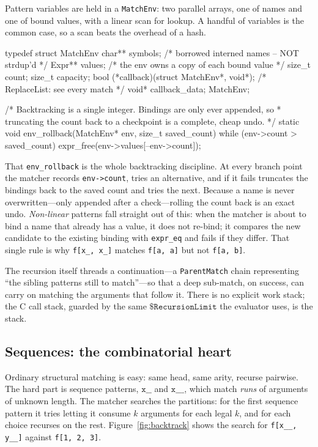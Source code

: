 Pattern variables are held in a \texttt{MatchEnv}: two parallel arrays, one of names
and one of bound values, with a linear scan for lookup. A handful of variables is the
common case, so a scan beats the overhead of a hash.

\begin{ccode}
typedef struct MatchEnv {
    char** symbols;     /* borrowed interned names -- NOT strdup'd     */
    Expr** values;      /* the env owns a copy of each bound value     */
    size_t count;
    size_t capacity;
    bool (*callback)(struct MatchEnv*, void*);  /* ReplaceList: see every match */
    void* callback_data;
} MatchEnv;

/* Backtracking is a single integer. Bindings are only ever appended, so
 * truncating the count back to a checkpoint is a complete, cheap undo. */
static void env_rollback(MatchEnv* env, size_t saved_count) {
    while (env->count > saved_count)
        expr_free(env->values[--env->count]);
}
\end{ccode}

That \texttt{env\_rollback} is the whole backtracking discipline. At every branch
point the matcher records \texttt{env->count}, tries an alternative, and if it fails
truncates the bindings back to the saved count and tries the next. Because a name is
never overwritten---only appended after a check---rolling the count back is an exact
undo. \emph{Non-linear} patterns fall straight out of this: when the matcher is about
to bind a name that already has a value, it does not re-bind; it compares the new
candidate to the existing binding with \texttt{expr\_eq} and fails if they differ.
That single rule is why \texttt{f[x\_, x\_]} matches \texttt{f[a, a]} but not
\texttt{f[a, b]}.

The recursion itself threads a continuation---a \texttt{ParentMatch} chain
representing ``the sibling patterns still to match''---so that a deep sub-match, on
success, can carry on matching the arguments that follow it. There is no explicit work
stack; the C call stack, guarded by the same \(\mathtt{\$RecursionLimit}\) the
evaluator uses, is the stack.

\subsection*{Sequences: the combinatorial heart}

Ordinary structural matching is easy: same head, same arity, recurse pairwise. The
hard part is sequence patterns, \(\mathtt{x\_\_}\) and \(\mathtt{x\_\_\_}\), which
match \emph{runs} of arguments of unknown length. The matcher searches the partitions:
for the first sequence pattern it tries letting it consume \(k\) arguments for each
legal \(k\), and for each choice recurses on the rest. Figure~\ref{fig:backtrack}
shows the search for \texttt{f[x\_\_, y\_\_]} against \texttt{f[1, 2, 3]}.

